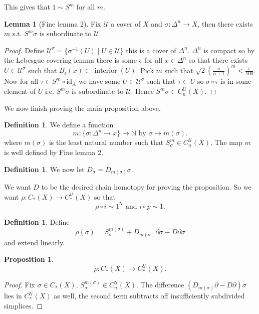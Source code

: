 \documentclass[12pt]{article}
\theoremstyle{definition}
\newtheorem{lem}[thm]{Lemma}
\newtheorem{prop}[thm]{Proposition}
\theoremstyle{definition}
\newtheorem{defn}[thm]{Definition}
\newcommand{\NN}{\mathbb{N}}
\newcommand{\C}{C_*}
\newcommand{\U}{\mathcal{U}}
\begin{document}
This gives that $1 \sim S^m$ for all $m$.

\begin{lem}[Fine lemma 2]
Fix $\U$ a cover of $X$ and $\sigma \colon \Delta^n \to X$, then there exists $m$ s.t. $S^m \sigma$ is subordinate to $\U$.
\end{lem}
\begin{proof}
Define $\U^\sigma = \{\sigma^{-1}(U) \mid U \in \U\}$ this is a cover of $\Delta^n$.
$\Delta^n$ is compact so by the Lebesgue covering lemma there is some $\epsilon$ for all $x \in \Delta^n$ so that there exists $U \in \U^\sigma$ such that $B_\epsilon(x) \subset \operatorname{interior}(U)$.
Pick $m$ such that $\sqrt{2} \left(\frac{n}{n+1} \right)^m < \frac{\epsilon}{100}$.
Now for all $\tau \in S^m \circ \text{id}_A$ we have some $U \in \U^\sigma$ such that $\tau \subset U$ so $\sigma \circ \tau$ is in some element of $U$ i.e. $S^m\sigma$ is subordinate to $\U$.
Hence $S^m \sigma \in C_n^\U (X)$.
\end{proof}

We now finish proving the main proposition above.

\begin{defn}
We define a function 
\[
m\colon \{ \sigma\colon \Delta^n \to x\} \to \NN \text{ by } \sigma \mapsto m(\sigma).
\]
where $m(\sigma)$ is the least natural number such that $S^m_\sigma \in C_n^\U(X)$.
The map $m$ is well defined by Fine lemma 2.
\end{defn}

\begin{defn}
We now let $D_\sigma = D_{m(\sigma)} \sigma$.
\end{defn}
We want $D$ to be the desired chain homotopy for proving the proposition.
So we want $\rho\colon \C(X) \to \C^\U(X)$ so that
\[
\rho\circ i \sim 1^\U \text{ and } i \circ p \sim 1.
\]

\begin{defn}
Define
\[
\rho(\sigma) = S_{\sigma}^{m(\sigma)} + D_{m(\sigma)} \partial \sigma - D \partial \sigma
\]
and extend linearly.
\end{defn}

\begin{prop}
\[
\rho\colon \C(X) \to \C^\U(X).
\]
\end{prop}
\begin{proof}
Fix $\sigma \in \C(X)$, $S_\sigma^{m(\sigma)} \in C_n^\U(X)$.
The difference $(D_{m(\sigma)} \partial - D \partial)\sigma$ lies in $\C^\U(X)$ as well, the second term subtracts off insufficiently subdivided simplices.
\end{proof}
\end{document}
